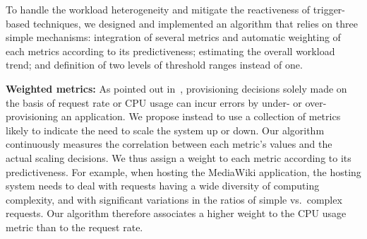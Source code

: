 To handle the workload heterogeneity and mitigate the reactiveness of
trigger-based techniques, we designed and implemented an algorithm
that relies on three simple mechanisms: integration of several metrics
and automatic weighting of each metrics according to its
predictiveness; estimating the overall workload trend; and definition
of two levels of threshold ranges instead of one.

\vspace{2mm}


\textbf{Weighted metrics:} As pointed out
in~\cite{singh_autonomic_2010}, provisioning decisions solely made on
the basis of request rate or CPU usage can incur errors by under- or
over-provisioning an application. We propose instead to use a
collection of metrics likely to indicate the need to scale the system
up or down. Our algorithm continuously measures the correlation
between each metric's values and the actual scaling decisions. We thus
assign a weight to each metric according to its predictiveness. For
example, when hosting the MediaWiki application, the hosting system
needs to deal with requests having a wide diversity of computing
complexity, and with significant variations in the ratios of simple
vs.\ complex requests. Our algorithm therefore associates a higher
weight to the CPU usage metric than to the request rate.



